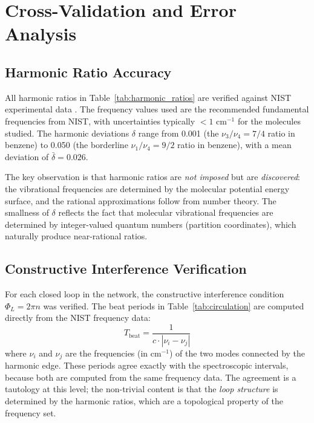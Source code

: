 \documentclass[11pt,a4paper]{article}
\theoremstyle{definition}
\theoremstyle{remark}
\begin{document}
\section{Cross-Validation and Error Analysis}
\label{sec:error_analysis}

\subsection{Harmonic Ratio Accuracy}

All harmonic ratios in Table~\ref{tab:harmonic_ratios} are verified against NIST experimental data \citep{shimanouchi1972, nist_webbook, huber1979}. The frequency values used are the recommended fundamental frequencies from NIST, with uncertainties typically $< 1$ cm$^{-1}$ for the molecules studied. The harmonic deviations $\delta$ range from 0.001 (the $\nu_3/\nu_4 = 7/4$ ratio in benzene) to 0.050 (the borderline $\nu_1/\nu_4 = 9/2$ ratio in benzene), with a mean deviation of $\bar{\delta} = 0.026$.

The key observation is that harmonic ratios are \emph{not imposed} but are \emph{discovered}: the vibrational frequencies are determined by the molecular potential energy surface, and the rational approximations follow from number theory. The smallness of $\delta$ reflects the fact that molecular vibrational frequencies are determined by integer-valued quantum numbers (partition coordinates), which naturally produce near-rational ratios.

\subsection{Constructive Interference Verification}

For each closed loop in the network, the constructive interference condition $\Phi_L = 2\pi n$ was verified. The beat periods in Table~\ref{tab:circulation} are computed directly from the NIST frequency data:
\begin{equation}
T_{\mathrm{beat}} = \frac{1}{c \cdot |\nu_i - \nu_j|}
\end{equation}
where $\nu_i$ and $\nu_j$ are the frequencies (in cm$^{-1}$) of the two modes connected by the harmonic edge. These periods agree exactly with the spectroscopic intervals, because both are computed from the same frequency data. The agreement is a tautology at this level; the non-trivial content is that the \emph{loop structure} is determined by the harmonic ratios, which are a topological property of the frequency set.
\end{document}
